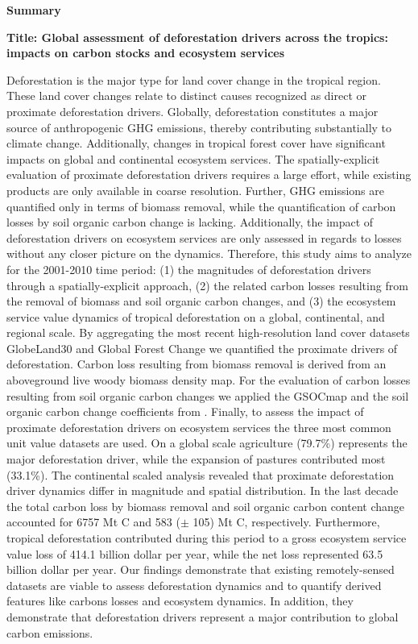 \thispagestyle{empty}

\begin{center}
	\textbf{Summary}
\end{center}
	\textbf{Title: Global assessment of deforestation drivers across the tropics: impacts on carbon stocks and ecosystem services}

	Deforestation is the major type for land cover change in the tropical region. These land cover changes relate to distinct causes recognized as direct or proximate deforestation drivers. Globally, deforestation constitutes a major source of anthropogenic \ac{GHG} emissions, thereby contributing substantially to climate change. Additionally, changes in tropical forest cover have significant impacts on global and continental ecosystem services. The spatially-explicit evaluation of proximate deforestation drivers requires a large effort, while existing products are only available in coarse resolution. Further, \ac{GHG} emissions are quantified only in terms of biomass removal, while the quantification of carbon losses by soil organic carbon change is lacking. Additionally, the impact of deforestation drivers on ecosystem services are only assessed in regards to losses without any closer picture on the dynamics. Therefore, this study aims to analyze for the 2001-2010 time period: (1) the magnitudes of deforestation drivers through a spatially-explicit approach, (2) the related carbon losses resulting from the removal of biomass and soil organic carbon changes, and (3) the ecosystem service value dynamics of tropical deforestation on a global, continental, and regional scale. By aggregating the most recent high-resolution land cover datasets GlobeLand30 and Global Forest Change we quantified the proximate drivers of deforestation. Carbon loss resulting from biomass removal is derived from an aboveground live woody biomass density map.  For the evaluation of carbon losses resulting from soil organic carbon changes we applied the GSOCmap and the soil organic carbon change coefficients from \citet{Don2010}. Finally, to assess the impact of proximate deforestation drivers on ecosystem services the three most common unit value datasets are used. On a global scale agriculture (79.7\%) represents the major deforestation driver, while the expansion of pastures contributed most (33.1\%). The continental scaled analysis revealed that proximate deforestation driver dynamics differ in magnitude and spatial distribution. In the last decade the total carbon loss by biomass removal and soil organic carbon content change accounted for 6757 Mt C and 583 ($\pm$ 105) Mt C, respectively. Furthermore, tropical deforestation contributed during this period to a gross ecosystem service value loss of 414.1 billion dollar per year, while the net loss represented 63.5 billion dollar per year.  Our findings demonstrate that existing remotely-sensed datasets are viable to assess deforestation dynamics and to quantify derived features like carbons losses and ecosystem dynamics. In addition, they demonstrate that deforestation drivers represent a major contribution to global carbon emissions. 

